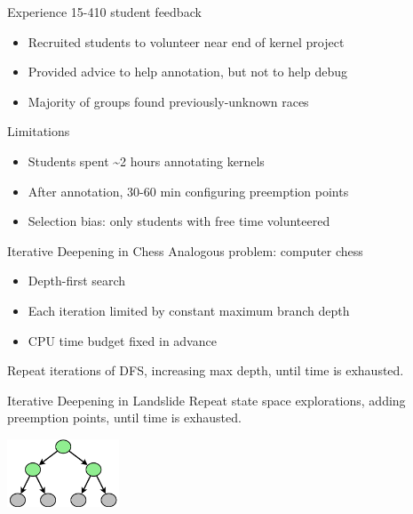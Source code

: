 \documentclass[xcolor=dvipsnames]{beamer}
\begin{document}
\begin{frame}{Experience}
	15-410 student feedback
	\begin{itemize}
		\item Recruited students to volunteer near end of kernel project
		\item Provided advice to help annotation, but not to help debug
		\item Majority of groups found previously-unknown races
	\end{itemize}
	\pause
	\linegap

	Limitations
	\begin{itemize}
		\item Students spent \textasciitilde{}2 hours annotating kernels
		\item After annotation, 30-60 min configuring preemption points
		\item Selection bias: only students with free time volunteered
	\end{itemize}
\end{frame}


\begin{frame}{Iterative Deepening in Chess}
	Analogous problem: computer chess
	\begin{itemize}
		\item Depth-first search
		\item Each iteration limited by constant maximum branch depth
		\item CPU time budget fixed in advance
	\end{itemize}
	\pause
	\linegap
	Repeat iterations of DFS, increasing max depth, until time is exhausted.
\end{frame}

\begin{frame}{Iterative Deepening in Landslide}
	Repeat state space explorations, adding preemption points, until time is exhausted.
	\pause
	\vspace{0.29in}
	\begin{center}
		\includegraphics[width=0.25\textwidth]{tree0.pdf}
	\end{center}
\end{frame}
\end{document}
